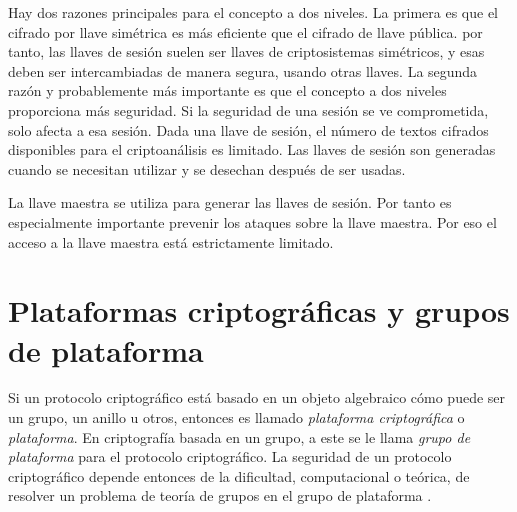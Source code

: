 \documentclass[12pt]{book}
\theoremstyle{definition}
\begin{document}
Hay dos razones principales para el concepto a dos niveles. La primera es que el cifrado por llave simétrica es más eficiente que el cifrado de llave pública. por tanto, las llaves de sesión suelen ser llaves de criptosistemas simétricos, y esas deben ser intercambiadas de manera segura, usando otras llaves. La segunda razón y probablemente más importante es que el concepto a dos niveles proporciona más seguridad. Si la seguridad de una sesión se ve comprometida, solo afecta a esa sesión. Dada una llave de sesión, el número de textos cifrados disponibles para el criptoanálisis es limitado. Las llaves de sesión son generadas cuando se necesitan utilizar y se desechan después de ser usadas.

La llave maestra se utiliza para generar las llaves de sesión. Por tanto es especialmente importante prevenir los ataques sobre la llave maestra. Por eso el acceso a la llave maestra está estrictamente limitado.





















\section{Plataformas criptográficas y grupos de plataforma}

Si un protocolo criptográfico está basado en un objeto algebraico cómo puede ser un grupo, un anillo u otros, entonces es llamado \textit{plataforma criptográfica} o \textit{plataforma}. En criptografía basada en un grupo, a este se le llama \textit{grupo de plataforma} para el protocolo criptográfico. La seguridad de un protocolo criptográfico depende entonces de la dificultad, computacional o teórica, de resolver un problema de teoría de grupos en el grupo de plataforma \cite{co_ma}.
\end{document}
